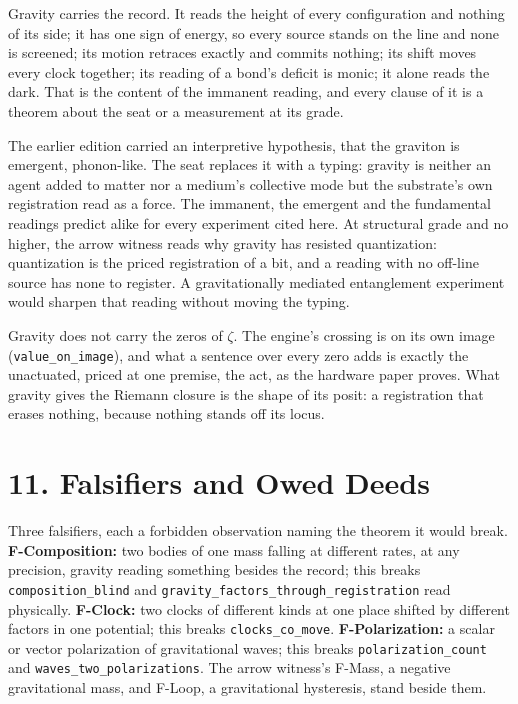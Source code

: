 \documentclass[10pt]{article}
\begin{document}
Gravity carries the record. It reads the height of every configuration
and nothing of its side; it has one sign of energy, so every source
stands on the line and none is screened; its motion retraces exactly and
commits nothing; its shift moves every clock together; its reading of a
bond's deficit is monic; it alone reads the dark. That is the content of
the immanent reading, and every clause of it is a theorem about the seat
or a measurement at its grade.

The earlier edition carried an interpretive hypothesis, that the
graviton is emergent, phonon-like. The seat replaces it with a typing:
gravity is neither an agent added to matter nor a medium's collective
mode but the substrate's own registration read as a force. The immanent,
the emergent and the fundamental readings predict alike for every
experiment cited here. At structural grade and no higher, the arrow
witness reads why gravity has resisted quantization: quantization is the
priced registration of a bit, and a reading with no off-line source has
none to register. A gravitationally mediated entanglement experiment
would sharpen that reading without moving the typing.

Gravity does not carry the zeros of \(\zeta\). The engine's crossing is
on its own image (\texttt{value\_on\_image}), and what a sentence over
every zero adds is exactly the unactuated, priced at one premise, the
act, as the hardware paper proves. What gravity gives the Riemann
closure is the shape of its posit: a registration that erases nothing,
because nothing stands off its locus.

\hypertarget{falsifiers-and-owed-deeds}{%
\section{11. Falsifiers and Owed
Deeds}\label{falsifiers-and-owed-deeds}}

Three falsifiers, each a forbidden observation naming the theorem it
would break. \textbf{F-Composition:} two bodies of one mass falling at
different rates, at any precision, gravity reading something besides the
record; this breaks \texttt{composition\_blind} and
\texttt{gravity\_factors\_through\_registration} read physically.
\textbf{F-Clock:} two clocks of different kinds at one place shifted by
different factors in one potential; this breaks
\texttt{clocks\_co\_move}. \textbf{F-Polarization:} a scalar or vector
polarization of gravitational waves; this breaks
\texttt{polarization\_count} and \texttt{waves\_two\_polarizations}. The
arrow witness's F-Mass, a negative gravitational mass, and F-Loop, a
gravitational hysteresis, stand beside them.
\end{document}
